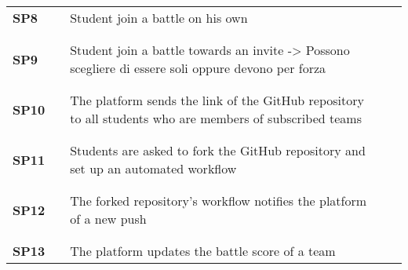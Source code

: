 \begin{longtable}[H]{l l p{8.5cm} l l}
    \textbf{SP8}  & \vline & Student join a battle on his own                                                                         & \vline &                        \\
                  &        &                                                                                                          &        &                        \\\hline & & & & \\
    \textbf{SP9}  & \vline & Student join a battle towards an invite -> Possono scegliere di essere soli oppure devono per forza      & \vline &                        \\
                  &        &                                                                                                          &        &                        \\\hline & & & & \\
    \textbf{SP10} & \vline & The platform sends the link of the GitHub repository to all students who are members of subscribed teams & \vline &                        \\
                  &        &                                                                                                          &        &                        \\\hline & & & & \\
    \textbf{SP11} & \vline & Students are asked to fork the GitHub repository and set up an automated workflow                        & \vline &                        \\
                  &        &                                                                                                          &        &                        \\\hline & & & & \\
    \textbf{SP12} & \vline & The forked repository's workflow notifies the platform of a new push                                     & \vline &                        \\
                  &        &                                                                                                          &        &                        \\\hline & & & & \\
    \textbf{SP13} & \vline & The platform updates the battle score of a team                                                          & \vline &                        \\

\end{longtable}
